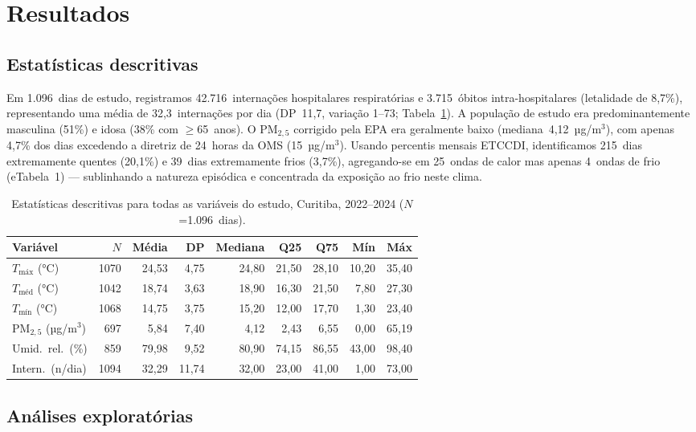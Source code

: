 \documentclass[12pt]{article}
\begin{document}
\section{Resultados}

\subsection{Estatísticas descritivas}

Em 1.096~dias de estudo, registramos 42.716~internações hospitalares
respiratórias e 3.715~óbitos intra-hospitalares (letalidade de 8,7\%),
representando uma média de 32,3~internações por dia (DP~11,7,
variação 1--73; Tabela~\ref{tab:descritiva}). A população de estudo
era predominantemente masculina (51\%) e idosa (38\% com $\geq$65~anos).
O PM$_{2,5}$ corrigido pela EPA era geralmente baixo
(mediana~4,12~µg/m$^3$), com apenas 4,7\% dos dias excedendo a
diretriz de 24~horas da OMS (15~µg/m$^3$). Usando percentis mensais
ETCCDI, identificamos 215~dias extremamente quentes (20,1\%) e
39~dias extremamente frios (3,7\%), agregando-se em 25~ondas de calor
mas apenas 4~ondas de frio (eTabela~1) --- sublinhando a natureza
episódica e concentrada da exposição ao frio neste clima.

\begin{table}[ht]
\centering
\caption{Estatísticas descritivas para todas as variáveis do estudo,
Curitiba, 2022--2024 ($N$=1.096~dias).}
\label{tab:descritiva}
\begin{tabular}{lrrrrrrrr}
\toprule
Variável & $N$ & Média & DP & Mediana & Q25 & Q75 & Mín & Máx \\
\midrule
$T_\mathrm{máx}$ (°C) & 1070 & 24,53 & 4,75 & 24,80 & 21,50 & 28,10 & 10,20 & 35,40 \\
$T_\mathrm{méd}$ (°C) & 1042 & 18,74 & 3,63 & 18,90 & 16,30 & 21,50 &  7,80 & 27,30 \\
$T_\mathrm{mín}$ (°C) & 1068 & 14,75 & 3,75 & 15,20 & 12,00 & 17,70 &  1,30 & 23,40 \\
PM$_{2,5}$ (µg/m$^3$) &  697 &  5,84 & 7,40 &  4,12 &  2,43 &  6,55 &  0,00 & 65,19 \\
Umid.\ rel.\ (\%)     &  859 & 79,98 &  9,52 & 80,90 & 74,15 & 86,55 & 43,00 & 98,40 \\
Intern.\ (n/dia)      & 1094 & 32,29 & 11,74 & 32,00 & 23,00 & 41,00 & 1,00 & 73,00 \\
\bottomrule
\end{tabular}
\end{table}

\subsection{Análises exploratórias}
\end{document}

